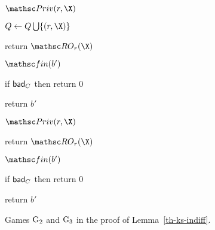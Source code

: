 \begin{figure}[tp]
	\begin{minipage}[t]{0.48\textwidth}
		\NewExperiment[Game $\Gm_2$]
		
			\begin{algorithm}{$\PrivO(\roIndex,\X)$}
				\item $Q \gets Q \bigcup \{(\roIndex,\X)\}$
				\item return $\RO_{\roIndex}(\X)$
			\end{algorithm}	
			\ExptSepSpace
			\begin{algorithm}{$\Finalize(b')$}
				\item {}
				\item \quad {}
				\item if $\mathsf{bad}_C$ then return $0$
				\item return $b'$
			\end{algorithm}
	
	\end{minipage}
\vline
\hspace{.02\textwidth}
	\begin{minipage}[t]{0.49\textwidth}
		\NewExperiment[Game $\Gm_3$]
	
		\ExptSepSpace
	\begin{algorithm}{$\PrivO(\roIndex,\X)$}
		\item {}
		\item return $\RO_{\roIndex}(\X)$
	\end{algorithm}	
	\ExptSepSpace
\begin{algorithm}{$\Finalize(b')$}
	\item if $\mathsf{bad}_C$ then return $0$
	\item return $b'$
\end{algorithm}
\end{minipage}
\label{fig:gm23-ks-indiff}
\caption{ Games $\Gm_2$ and $\Gm_3$ in the proof of Lemma~\ref{th-ks-indiff}.}
\end{figure}

